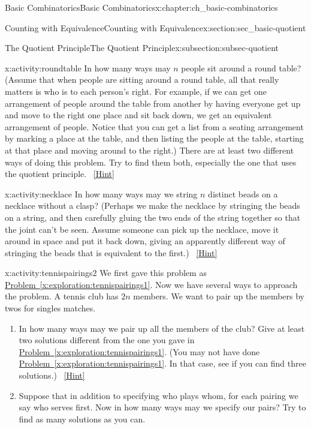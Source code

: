 \documentclass[oneside,10pt,]{book}
\numberwithin{equation}{chapter}
\begin{document}
\begin{chapterptx}{Basic Combinatorics}{}{Basic Combinatorics}{}{}{x:chapter:ch_basic-combinatorics}
\begin{sectionptx}{Counting with Equivalence}{}{Counting with Equivalence}{}{}{x:section:sec_basic-quotient}
\begin{subsectionptx}{The Quotient Principle}{}{The Quotient Principle}{}{}{x:subsection:subsec-quotient}
\begin{activity}{}{x:activity:roundtable}
In how many ways may \(n\) people sit around a round table? (Assume that when people are sitting around a round table, all that really matters is who is to each person's right. For example, if we can get one arrangement of people around the table from another by having everyone get up and move to the right one place and sit back down, we get an equivalent arrangement of people. Notice that you can get a list from a seating arrangement by marking a place at the table, and then listing the people at the table, starting at that place and moving around to the right.) There are at least two different ways of doing this problem. Try to find them both, especially the one that uses the quotient principle.%
\qquad~\hfill{\tiny\hyperlink{g:hint:idm1850-back}{[Hint]}}\end{activity}
\begin{activity}{}{x:activity:necklace}%
In how many ways may we string \(n\) distinct beads on a necklace without a clasp? (Perhaps we make the necklace by stringing the beads on a string, and then carefully gluing the two ends of the string together so that the joint can't be seen. Assume someone can pick up the necklace, move it around in space and put it back down, giving an apparently different way of stringing the beads that is equivalent to the first.)%
\qquad~\hfill{\tiny\hyperlink{g:hint:idm1871-back}{[Hint]}}\end{activity}
\begin{activity}{}{x:activity:tennispairings2}%
We first gave this problem as \hyperref[x:exploration:tennispairings1]{Problem~\ref{x:exploration:tennispairings1}}. Now we have several ways to approach the problem. A tennis club has \(2n\) members. We want to pair up the members by twos for singles matches.%
\begin{enumerate}[font=\bfseries,label=(\alph*),ref=\alph*]
\item{}In how many ways may we pair up all the members of the club? Give at least two solutions different from the one you gave in   \hyperref[x:exploration:tennispairings1]{Problem~\ref{x:exploration:tennispairings1}}. (You may not have done \hyperref[x:exploration:tennispairings1]{Problem~\ref{x:exploration:tennispairings1}}. In that case, see if you can find three solutions.)%
\qquad~\hfill{\tiny\hyperlink{g:hint:idm1897-back}{[Hint]}}\item{}Suppose that in addition to specifying who plays whom, for each pairing we say who serves first.  Now in how many ways may we specify our pairs? Try to find as many solutions as you can.%

\end{enumerate}
\end{activity}
\end{subsectionptx}
\end{sectionptx}
\end{chapterptx}
\end{document}
